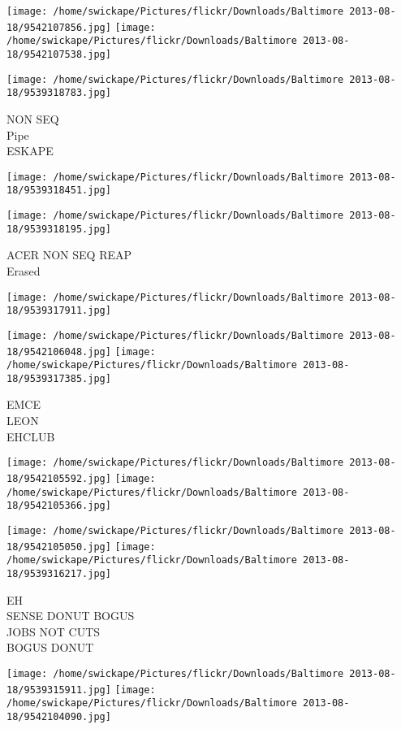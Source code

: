 \documentclass[10pt,letterpaper]{article}
\begin{document}
\texttt{[image: /home/swickape/Pictures/flickr/Downloads/Baltimore 2013-08-18/9542107856.jpg]}
\texttt{[image: /home/swickape/Pictures/flickr/Downloads/Baltimore 2013-08-18/9542107538.jpg]}

\vspace{0.25in}
\texttt{[image: /home/swickape/Pictures/flickr/Downloads/Baltimore 2013-08-18/9539318783.jpg]}

NON SEQ\\
Pipe\\
ESKAPE
\pagebreak

\texttt{[image: /home/swickape/Pictures/flickr/Downloads/Baltimore 2013-08-18/9539318451.jpg]}

\vspace{0.25in}
\texttt{[image: /home/swickape/Pictures/flickr/Downloads/Baltimore 2013-08-18/9539318195.jpg]}

ACER NON SEQ REAP\\
Erased
\pagebreak

\texttt{[image: /home/swickape/Pictures/flickr/Downloads/Baltimore 2013-08-18/9539317911.jpg]}

\vspace{0.25in}
\texttt{[image: /home/swickape/Pictures/flickr/Downloads/Baltimore 2013-08-18/9542106048.jpg]}
\texttt{[image: /home/swickape/Pictures/flickr/Downloads/Baltimore 2013-08-18/9539317385.jpg]}

EMCE\\
LEON\\
EHCLUB
\pagebreak

\texttt{[image: /home/swickape/Pictures/flickr/Downloads/Baltimore 2013-08-18/9542105592.jpg]}
\texttt{[image: /home/swickape/Pictures/flickr/Downloads/Baltimore 2013-08-18/9542105366.jpg]}

\texttt{[image: /home/swickape/Pictures/flickr/Downloads/Baltimore 2013-08-18/9542105050.jpg]}
\texttt{[image: /home/swickape/Pictures/flickr/Downloads/Baltimore 2013-08-18/9539316217.jpg]}

EH\\
SENSE DONUT BOGUS\\
JOBS NOT CUTS\\
BOGUS DONUT
\pagebreak

\texttt{[image: /home/swickape/Pictures/flickr/Downloads/Baltimore 2013-08-18/9539315911.jpg]}
\texttt{[image: /home/swickape/Pictures/flickr/Downloads/Baltimore 2013-08-18/9542104090.jpg]}
\end{document}
